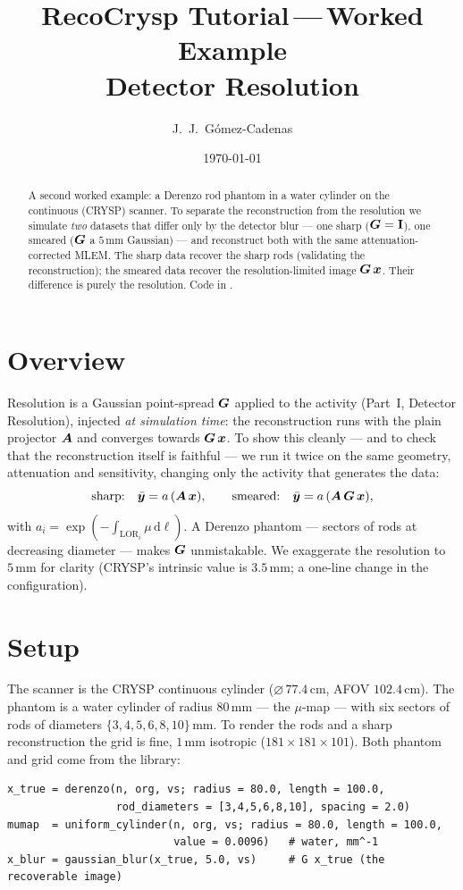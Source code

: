 \documentclass[11pt,a4paper]{article}
\title{RecoCrysp Tutorial\,---\,Worked Example\\[2pt]
       \large Detector Resolution}
\author{J.~J.~G\'omez-Cadenas}
\date{\today}
\begin{document}
\maketitle

\begin{abstract}
A second worked example: a Derenzo rod phantom in a water cylinder on the
continuous (CRYSP) scanner. To separate the reconstruction from the resolution we
simulate \emph{two} datasets that differ only by the detector blur --- one sharp
($\bm{G}=\mathbf I$), one smeared ($\bm{G}$ a $5\,\mathrm{mm}$ Gaussian) --- and
reconstruct both with the same attenuation-corrected MLEM. The sharp data
recover the sharp rods (validating the reconstruction); the smeared data recover
the resolution-limited image $\bm{G}\,\bm{x}$. Their difference is purely the
resolution. Code in .
\end{abstract}

\section{Overview}
\label{sec:ex-res:overview}

Resolution is a Gaussian point-spread $\bm{G}$ applied to the activity (Part~I,
Detector Resolution), injected \emph{at simulation time}: the reconstruction runs
with the plain projector $\bm{A}$ and converges towards $\bm{G}\,\bm{x}$. To show this
cleanly --- and to check that the reconstruction itself is faithful --- we run it
twice on the same geometry, attenuation and sensitivity, changing only the
activity that generates the data:
\begin{equation}
  \text{sharp:}\quad \bar{\bm{y}} = a\,(\bm{A}\,\bm{x}) ,
  \qquad
  \text{smeared:}\quad \bar{\bm{y}} = a\,(\bm{A}\,\bm{G}\,\bm{x}) ,
  \label{eq:ex-res-two}
\end{equation}
with $a_i=\exp(-\!\int_{\mathrm{LOR}_i}\mu\,\mathrm{d}\ell)$. A Derenzo phantom
--- sectors of rods at decreasing diameter --- makes $\bm{G}$ unmistakable. We
exaggerate the resolution to $5\,\mathrm{mm}$ for clarity (CRYSP's intrinsic
value is $3.5\,\mathrm{mm}$; a one-line change in the configuration).

\section{Setup}
\label{sec:ex-res:setup}

The scanner is the CRYSP continuous cylinder
($\varnothing\,77.4\,\mathrm{cm}$, AFOV $102.4\,\mathrm{cm}$). The phantom is a
water cylinder of radius $80\,\mathrm{mm}$ --- the $\mu$-map --- with six sectors
of rods of diameters $\{3,4,5,6,8,10\}\,\mathrm{mm}$. To render the rods and a
sharp reconstruction the grid is fine, $1\,\mathrm{mm}$ isotropic
($181\times181\times101$). Both phantom and grid come from the library:
\begin{lstlisting}
x_true = derenzo(n, org, vs; radius = 80.0, length = 100.0,
                 rod_diameters = [3,4,5,6,8,10], spacing = 2.0)
mumap  = uniform_cylinder(n, org, vs; radius = 80.0, length = 100.0,
                          value = 0.0096)   # water, mm^-1
x_blur = gaussian_blur(x_true, 5.0, vs)     # G x_true (the recoverable image)
\end{lstlisting}
\end{document}
